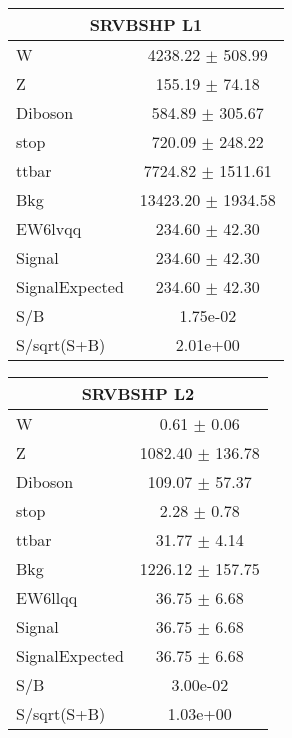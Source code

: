 \begin{table} [h]
{\begin{tabular}{|l|c|}
\end{tabular}
\begin{tabular}{|l|c|}
\hline
  \multicolumn{2}{|c|}{SRVBSHP L1}\\ \hline
W & 4238.22 $\pm$ 508.99\\
Z & 155.19 $\pm$ 74.18\\
Diboson & 584.89 $\pm$ 305.67\\
stop & 720.09 $\pm$ 248.22\\
ttbar & 7724.82 $\pm$ 1511.61\\
\hline
Bkg & 13423.20 $\pm$ 1934.58\\
\hline
EW6lvqq & 234.60 $\pm$ 42.30\\
\hline
Signal & 234.60 $\pm$ 42.30\\
SignalExpected & 234.60 $\pm$ 42.30\\
\hline
S/B & 1.75e-02\\
S/sqrt(S+B) & 2.01e+00\\  \hline
\end{tabular}
\begin{tabular}{|l|c|}
\hline
  \multicolumn{2}{|c|}{SRVBSHP L2}\\ \hline
W & 0.61 $\pm$ 0.06\\
Z & 1082.40 $\pm$ 136.78\\
Diboson & 109.07 $\pm$ 57.37\\
stop & 2.28 $\pm$ 0.78\\
ttbar & 31.77 $\pm$ 4.14\\
\hline
Bkg & 1226.12 $\pm$ 157.75\\
\hline
EW6llqq & 36.75 $\pm$ 6.68\\
\hline
Signal & 36.75 $\pm$ 6.68\\
SignalExpected & 36.75 $\pm$ 6.68\\
\hline
S/B & 3.00e-02\\
S/sqrt(S+B) & 1.03e+00\\  \hline
\end{tabular}
}
 \end{table}


